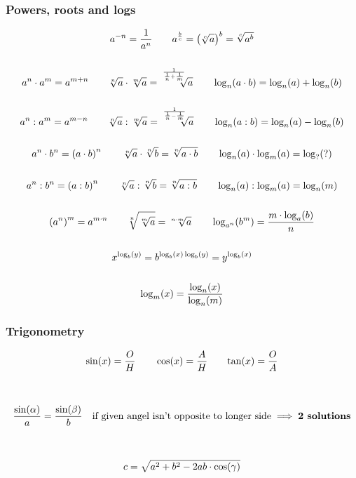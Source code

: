 \subsubsection{Powers, roots and logs}

\begin{gather*}
    a^{-n} = \dfrac{1}{a^n} \qquad
    a^{\frac{ b}{ c}} = \left( \sqrt[ c]{a} \space\right)^b =  \sqrt[ c]{a^b}
    \\\\
    a^n \cdot a^m = a^{m+n} \qquad
    \sqrt[n]{a}\cdot\sqrt[m]{a} = \sqrt[\uproot{15}\frac{1}{\frac{1}{n}+\frac{1}{m}}]{a} \qquad
    \log_n(a\cdot b)=\log_n(a) + \log_n(b)
    \\\\
    a^n : a^m = a^{m-n} \qquad
    \sqrt[n]{a}:\sqrt[m]{a} = \sqrt[\uproot{15}\frac{1}{\frac{1}{n}-\frac{1}{m}}]{a} \qquad    
    \log_n(a : b)=\log_n(a) - \log_n(b) 
    \\\\
    a^n \cdot b^n = \left( a \cdot b\right)^n \qquad
    \sqrt[n]{a} \cdot \sqrt[n]{b} = \sqrt[n]{a \cdot b} \qquad
    \log_n(a)\cdot\log_m(a) = \log_?(?)
    \\\\
    a^n : b^n = \left(a : b\right)^n \qquad
    \sqrt[n]{a} : \sqrt[n]{b} = \sqrt[n]{a : b} \qquad
    \log_n(a):\log_m(a) = \log_n(m)
    \\\\ 
    \left( a^n \right) ^ m = a^{m\space\cdot\space n}\qquad
    \sqrt[n]{\sqrt[m]{a}} = \sqrt[n \cdot m]{a}  \qquad
    \log_{a^n}(b^m) = \frac{m\cdot\log_a(b)}{n}
    \\\\
    x^{\log_b(y)}=b^{\log_b(x)\log_b(y)}=y^{\log_b(x)}
    \\\\
    \log_m(x) = \dfrac{\log_n(x)}{\log_n(m)}
\end{gather*}


\subsubsection{Trigonometry}

\begin{gather*}
    \sin(x) = \dfrac{O}{H} \qquad \cos(x) = \dfrac{A}{H} \qquad \text{tan}(x) = \dfrac{O}{A} \\ \space \\
    \\
    \dfrac{\text{sin}(\alpha)}{a} = \dfrac{\text{sin}(\beta)}{b}\kern 1em \text{if given angel isn't opposite to longer side} \implies \textbf{2 solutions} \\ \space \\
    \\
    c = \sqrt{a^2+b^2-2ab\cdot\text{cos}(\gamma)}
\end{gather*}